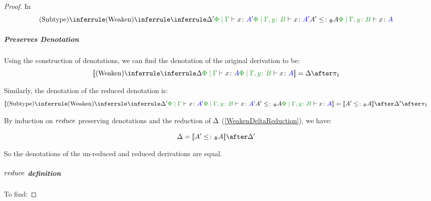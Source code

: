 \documentclass{report}
\begin{document}
\begin{framed}
\begin{proof}
                    In 
                    \begin{equation}
                        \ntreeruleII{Subtype}{
                        \ntreeruleI{Weaken}{
                            \treeruleI{\D'}{\gpetyperelation{x}{A'}}
                        } {
                            \etyperelation{\P}{\gby}{x}{A'}
                        }
                        }{
                        A' \subtypep A
                        }{\etyperelation{\P}{\gby}{x}{A}}
                    \end{equation}
        
                    \subparagraph{Preserves Denotation}
                    Using the construction of denotations, we can find the denotation of the original derivation to be:
                    \begin{equation}
                        \deno{\ntreeruleI{Weaken}{\treeruleI{\D}{\gpetyperelation{x}{A}}}{\etyperelation{\P}{\gby}{x}{A}}} = \D \after \p
                    \end{equation}
        
                    Similarly, the denotation of the reduced denotation is:
                    \begin{equation}
                        \deno{\ntreeruleII{Subtype}{
                            \ntreeruleI{Weaken}{
                                \treeruleI{\D'}{\gpetyperelation{x}{A'}}
                            } {
                                \etyperelation{\P}{\gby}{x}{A'}
                            }
                            }{
                            A' \subtypep A
                            }{\etyperelation{\P}{\gby}{x}{A}}} = \deno{A'\subtypep A}\after \D' \after \p
                    \end{equation}
        
        
                    By induction on $reduce$ preserving denotations and the reduction of $\Delta$ (\ref{WeakenDeltaReduction}), we have:
        
                    \begin{equation}
                        \D = \deno{A' \subtypep A}\after\D'
                    \end{equation}
        
                    So the denotations of the un-reduced and reduced derivations are equal.
        
                    \subparagraph{$reduce$ definition}
                        To find:
                    

\end{proof}
\end{framed}
\end{document}
